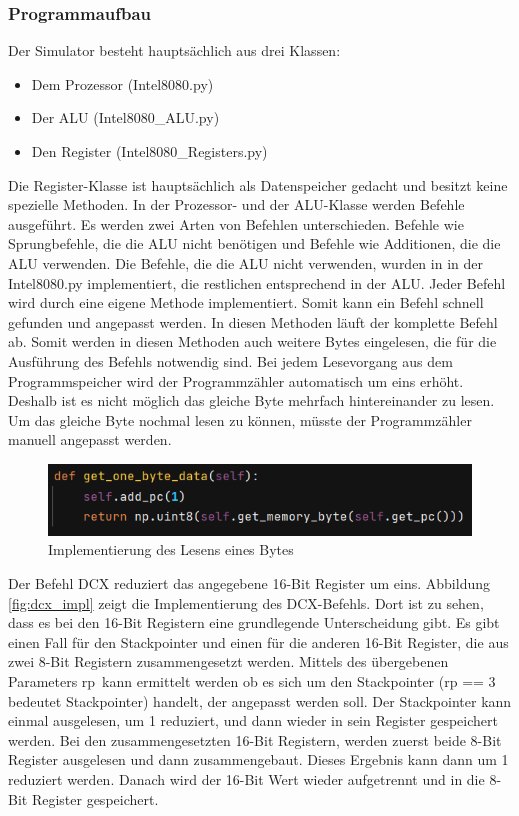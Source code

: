 \documentclass[12pt]{article}
\newcommand{\imgSpaceBefore}{\vspace{10pt}}
\begin{document}
\subsubsection{Programmaufbau}
\label{chapter:MPS_aufbau}

Der Simulator besteht hauptsächlich aus drei Klassen:

\begin{itemize}
\item Dem Prozessor (Intel8080.py)
\item Der ALU (Intel8080\_ALU.py)
\item Den Register (Intel8080\_Registers.py)
\end{itemize} 

\noindent
Die Register-Klasse ist hauptsächlich als Datenspeicher gedacht und besitzt keine spezielle Methoden. In der Prozessor- und der ALU-Klasse werden Befehle ausgeführt. Es werden zwei Arten von Befehlen unterschieden. Befehle wie Sprungbefehle, die die ALU nicht benötigen und Befehle wie Additionen, die die ALU verwenden. 
Die Befehle, die die ALU nicht verwenden, wurden in in der Intel8080.py implementiert, die restlichen entsprechend in der ALU. Jeder Befehl wird durch eine eigene Methode implementiert. Somit kann ein Befehl schnell gefunden und angepasst werden. In diesen Methoden läuft der komplette Befehl ab. Somit werden in diesen Methoden auch weitere Bytes eingelesen, die für die Ausführung des Befehls notwendig sind.
Bei jedem Lesevorgang aus dem Programmspeicher wird der Programmzähler automatisch um eins erhöht. Deshalb ist es nicht möglich das gleiche Byte mehrfach hintereinander zu lesen. Um das gleiche Byte nochmal lesen zu können, müsste der Programmzähler manuell angepasst werden.

\imgSpaceBefore
\begin{figure}[h]
\centering
\includegraphics[width=15cm]{Bilder/GetOneByteData}
\caption{Implementierung des Lesens eines Bytes}
\label{fig:GetOneByteData}
\end{figure}

\noindent
Der Befehl DCX reduziert das angegebene 16-Bit Register um eins. Abbildung \ref{fig:dcx_impl} zeigt die Implementierung des DCX-Befehls.
Dort ist zu sehen, dass es bei den 16-Bit Registern eine grundlegende Unterscheidung gibt. Es gibt einen Fall für den Stackpointer und einen für die anderen 16-Bit Register, die aus zwei 8-Bit Registern zusammengesetzt werden. Mittels des übergebenen Parameters \glqq rp\grqq\ kann ermittelt werden ob es sich um den Stackpointer (rp  == 3 bedeutet Stackpointer) handelt, der angepasst werden soll.
Der Stackpointer kann einmal ausgelesen, um 1 reduziert, und dann wieder in sein Register gespeichert werden.
Bei den zusammengesetzten 16-Bit Registern, werden zuerst beide 8-Bit Register ausgelesen und dann zusammengebaut. Dieses Ergebnis kann dann um 1 reduziert werden. Danach wird der 16-Bit Wert wieder aufgetrennt und in die 8-Bit Register gespeichert. 
\end{document}
